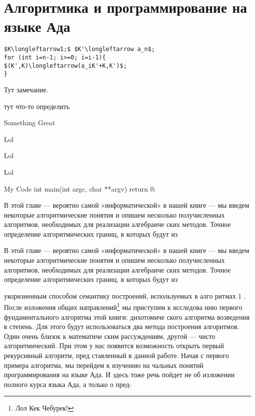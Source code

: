 \documentclass{mai_book}
\begin{document}
\chapter{Алгоритмика и \newline программирование на \newline языке Ада}


\begin{lstlisting}[mathescape=true, caption=Lol]
$K\longleftarrow1;$ $K'\longleftarrow a_n$;
for (int i=n-1; i>=0; i=i-1){
$(K',K)\longleftarrow(a_iK'+K,K')$;
}
\end{lstlisting} 
 
 
\begin{mynotice}
Тут замечание.
\end{mynotice}
 
 
\begin{determ}[Lol]
тут что-то определить
\end{determ}

\begin{thm}
Something Great
\end{thm}

\begin{sled}
Lol
\end{sled}

\begin{bezpodpisi}
Lol
\end{bezpodpisi}

\begin{thm}
Lol
\end{thm}


\begin{namedlisting}{My Code}
int main(int argc, char **argv) {
    return 0;
}
\end{namedlisting}
В этой главе — вероятно самой «информатической» в нашей книге —
мы введем некоторые алгоритмические понятия и опишем несколько
получисленных алгоритмов, необходимых для реализации алгебраиче­
ских методов.
Точное определение алгоритмических границ, в которых будут из­
\begin{determ}
В этой главе — вероятно самой «информатической» в нашей книге —
мы введем некоторые алгоритмические понятия и опишем несколько
\hspace*{7pt} получисленных алгоритмов, необходимых для реализации алгебраиче­
ских методов.
Точное определение алгоритмических границ, в которых будут из­
\end{determ}
укоризненным способом семантику построений, используемых в алго­
ритмах 1 .
После изложения общих направлений\footnote{Лол Кек Чебурек!} мы приступим к исследова­
нию первого фундаментального алгоритма этой книги: дихотомиче­
ского алгоритма возведения в степень. Для этого будут использоваться
два метода построения алгоритмов. Один очень близок к математиче­
ским рассуждениям, другой — чисто алгоритмический. При этом у нас
появится возможность открыть первый рекурсивный алгоритм, пред­
ставленный в данной работе.
Начав с первого примера алгоритма, мы перейдем к изучению на­
чальных понятий программирования на языке Ада. И здесь тоже речь
пойдет не об изложении полного курса языка Ада, а только о пред-
\end{document}
